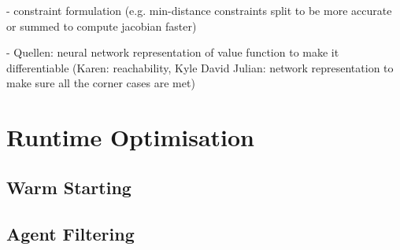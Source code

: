 - constraint formulation (e.g. min-distance constraints split to be more accurate or summed to compute jacobian faster)

- Quellen: neural network representation of value function to make it differentiable (Karen: reachability, Kyle David Julian: network representation to make sure all the corner cases are met)

\section{Runtime Optimisation}
\label{text:approach/runtime}

\subsection{Warm Starting}
\label{text:approach/runtime/warm_starting}

\subsection{Agent Filtering}
\label{text:approach/runtime/filtering}

